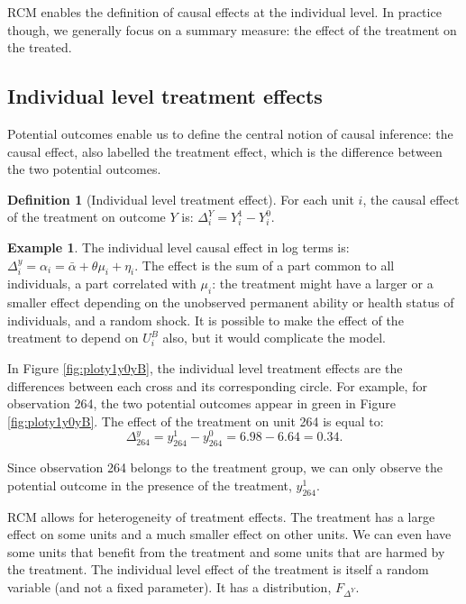 \documentclass[
]{book}
\theoremstyle{definition}
\newtheorem{definition}{Definition}[chapter]
\theoremstyle{definition}
\newtheorem{example}{Example}[chapter]
\theoremstyle{definition}
\theoremstyle{definition}
\theoremstyle{remark}
\begin{document}
RCM enables the definition of causal effects at the individual level.
In practice though, we generally focus on a summary measure: the effect of the treatment on the treated.

\hypertarget{individual-level-treatment-effects}{%
\subsection{Individual level treatment effects}\label{individual-level-treatment-effects}}

Potential outcomes enable us to define the central notion of causal inference: the causal effect, also labelled the treatment effect, which is the difference between the two potential outcomes.

\begin{definition}[Individual level treatment effect]
\protect\hypertarget{def:causaleff}{}{\label{def:causaleff} \iffalse (Individual level treatment effect) \fi{} }For each unit \(i\), the causal effect of the treatment on outcome \(Y\) is: \(\Delta^Y_i=Y_i^1-Y_i^0\).
\end{definition}

\begin{example}
\protect\hypertarget{exm:unnamed-chunk-7}{}{\label{exm:unnamed-chunk-7} }The individual level causal effect in log terms is: \(\Delta^y_i=\alpha_i=\bar{\alpha}+\theta\mu_i+\eta_i\).
The effect is the sum of a part common to all individuals, a part correlated with \(\mu_i\): the treatment might have a larger or a smaller effect depending on the unobserved permanent ability or health status of individuals, and a random shock.
It is possible to make the effect of the treatment to depend on \(U_i^B\) also, but it would complicate the model.
\end{example}

In Figure \ref{fig:ploty1y0yB}, the individual level treatment effects are the differences between each cross and its corresponding circle.
For example, for observation 264, the two potential outcomes appear in green in Figure \ref{fig:ploty1y0yB}.
The effect of the treatment on unit 264 is equal to:
\[
\Delta^y_{264}=y^1_{264}-y^0_{264}=6.98-6.64=0.34.
\]

Since observation 264 belongs to the treatment group, we can only observe the potential outcome in the presence of the treatment, \(y^1_{264}\).

RCM allows for heterogeneity of treatment effects.
The treatment has a large effect on some units and a much smaller effect on other units.
We can even have some units that benefit from the treatment and some units that are harmed by the treatment.
The individual level effect of the treatment is itself a random variable (and not a fixed parameter).
It has a distribution, \(F_{\Delta^Y}\).
\end{document}
